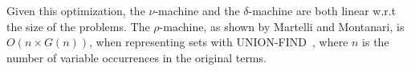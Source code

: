 \documentclass[a4paper,UKenglish]{lipics-v2016}
\begin{document}
    Given this optimization, the $\nu$-machine and the $\delta$-machine
    are both linear w.r.t the size of the problems.
    The $\rho$-machine, as shown by Martelli and Montanari, is $O(n \times G(n))$,
    when representing sets with UNION-FIND~\cite{tarjan_efficiency_1975},
    where $n$ is the number of variable occurrences in the original terms.

    \clearpage


\end{document}
